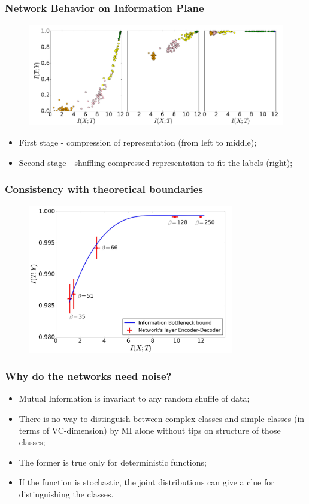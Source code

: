 \documentclass[11pt,xcolor=x11names,compress]{beamer}
\renewcommand{\(}{\begin{columns}}
\renewcommand{\)}{\end{columns}}
\newcommand{\<}[1]{\begin{column}{#1}}
\renewcommand{\>}{\end{column}}
\begin{document}
\begin{frame}
	\frametitle{Network Behavior on Information Plane}
	\begin{figure}
		\includegraphics[width=\textwidth]{InformationPlane.png}
	\end{figure}
	\begin{itemize}
		\item First stage - compression of representation (from left to middle);
		\item Second stage - shuffling compressed representation to fit the labels (right);
	\end{itemize}
\end{frame}

\begin{frame}
	\frametitle{Consistency with theoretical boundaries}
	\begin{figure}
		\includegraphics[width=0.8\textwidth]{TheoreticalBound.png}
	\end{figure}
\end{frame}

\begin{frame}
	\frametitle{Why do the networks need noise?}
	\begin{itemize}
		\item Mutual Information is invariant to any random shuffle of data;
		\item There is no way to distinguish between complex classes and simple classes (in terms of VC-dimension) by MI alone without tips on structure of those classes;
		\item The former is true only for deterministic functions;
		\item If the function is stochastic, the joint distributions can give a clue for distinguishing the classes.
	\end{itemize}
\end{frame}
\end{document}
